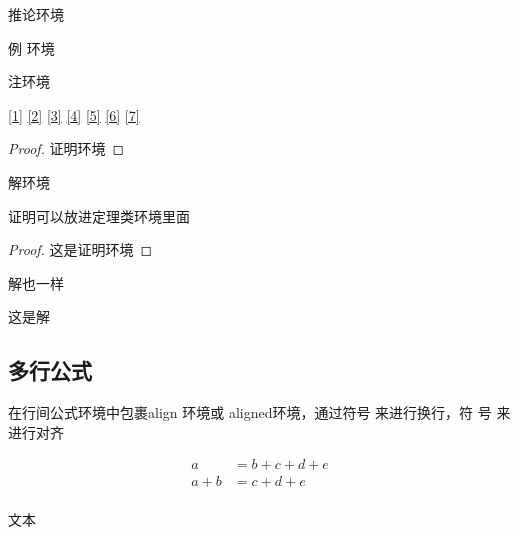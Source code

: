 \documentclass[../../main.tex]{subfiles}
\begin{document}
\begin{corollary}\label{5}
推论环境
\end{corollary}


\begin{example}\label{6}
例 环境
\end{example}






\begin{remark}\label{7}
\label{thm:thm1}
  注环境
\end{remark}




\autoref{1}
\autoref{2}
\autoref{3}
\autoref{4}
\autoref{5}
\autoref{6}
\autoref{7}

\begin{proof}
证明环境
\end{proof}


\begin{solution}
解环境
\end{solution}



\begin{theorem}

  证明可以放进定理类环境里面
\begin{proof}
这是证明环境
\end{proof}
\end{theorem}

\begin{example}
解也一样

\begin{solution}
这是解
\end{solution}

\end{example}


\subsection{多行公式}
在行间公式环境中包裹align 环境或 aligned环境，通过符号 来进行换行，符
号 来进行对齐

\begin{equation}
  \label{}
\begin{aligned}
  a&=b+c+d+e \\
  a+b&=c+d+e \\
\end{aligned}
\end{equation}




文本
\end{document}
